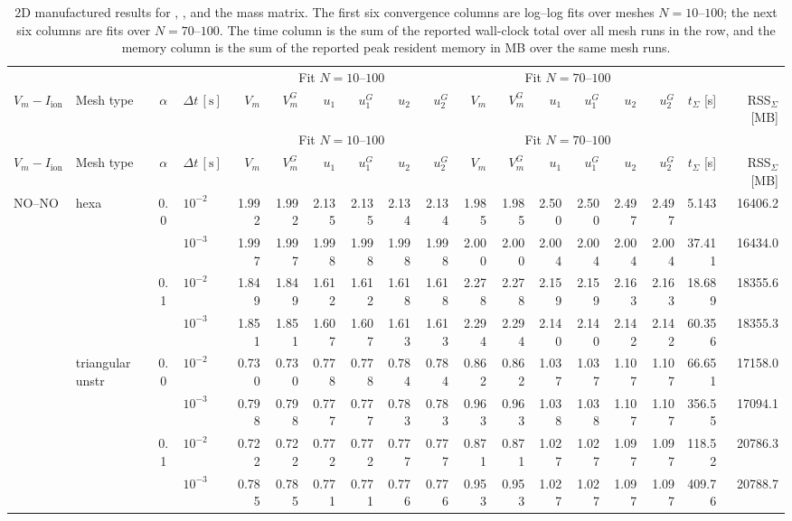 \tiny
\setlength{\tabcolsep}{1.7pt}
\begin{longtable}{llclrrrrrrrrrrrrrr}
\caption{2D manufactured results for , , and the  mass matrix. The first six convergence columns are log--log fits over meshes $N=10$--$100$; the next six columns are fits over $N=70$--$100$. The time column is the sum of the reported wall-clock total over all mesh runs in the row, and the memory column is the sum of the reported peak resident memory in MB over the same mesh runs.}\label{tab:results-2d-picard-cn-cons}\\
\toprule
& & & & \multicolumn{6}{c}{Fit $N=10$--$100$} & \multicolumn{6}{c}{Fit $N=70$--$100$} & & \\
\cmidrule(lr){5-10}\cmidrule(lr){11-16}
$V_m-I_{\mathrm{ion}}$ & Mesh type & $\alpha$ & $\Delta t\,[\text{s}]$ & $V_m$ & $V_m^G$ & $u_1$ & $u_1^G$ & $u_2$ & $u_2^G$ & $V_m$ & $V_m^G$ & $u_1$ & $u_1^G$ & $u_2$ & $u_2^G$ & $t_{\Sigma}$ [s] & RSS$_{\Sigma}$ [MB] \\
\midrule
\endfirsthead
\toprule
& & & & \multicolumn{6}{c}{Fit $N=10$--$100$} & \multicolumn{6}{c}{Fit $N=70$--$100$} & & \\
\cmidrule(lr){5-10}\cmidrule(lr){11-16}
$V_m-I_{\mathrm{ion}}$ & Mesh type & $\alpha$ & $\Delta t\,[\text{s}]$ & $V_m$ & $V_m^G$ & $u_1$ & $u_1^G$ & $u_2$ & $u_2^G$ & $V_m$ & $V_m^G$ & $u_1$ & $u_1^G$ & $u_2$ & $u_2^G$ & $t_{\Sigma}$ [s] & RSS$_{\Sigma}$ [MB] \\
\midrule
\endhead
\multirow{8}{*}{NO--NO} & \multirow{4}{*}{hexa} & \multirow{2}{*}{0.0} & $10^{-2}$ & 1.992 & 1.992 & 2.135 & 2.135 & 2.134 & 2.134 & 1.985 & 1.985 & 2.500 & 2.500 & 2.497 & 2.497 & 5.143 & 16406.2 \\
& & & $10^{-3}$ & 1.997 & 1.997 & 1.998 & 1.998 & 1.998 & 1.998 & 2.000 & 2.000 & 2.004 & 2.004 & 2.004 & 2.004 & 37.411 & 16434.0 \\\cline{3-18}
& & \multirow{2}{*}{0.1} & $10^{-2}$ & 1.849 & 1.849 & 1.612 & 1.612 & 1.618 & 1.618 & 2.278 & 2.278 & 2.159 & 2.159 & 2.163 & 2.163 & 18.689 & 18355.6 \\
& & & $10^{-3}$ & 1.851 & 1.851 & 1.607 & 1.607 & 1.613 & 1.613 & 2.294 & 2.294 & 2.140 & 2.140 & 2.142 & 2.142 & 60.356 & 18355.3 \\\cline{2-18}
& \multirow{4}{*}{triangular unstr} & \multirow{2}{*}{0.0} & $10^{-2}$ & 0.730 & 0.730 & 0.778 & 0.778 & 0.784 & 0.784 & 0.862 & 0.862 & 1.037 & 1.037 & 1.107 & 1.107 & 66.651 & 17158.0 \\
& & & $10^{-3}$ & 0.798 & 0.798 & 0.777 & 0.777 & 0.783 & 0.783 & 0.963 & 0.963 & 1.038 & 1.038 & 1.107 & 1.107 & 356.55 & 17094.1 \\\cline{3-18}
& & \multirow{2}{*}{0.1} & $10^{-2}$ & 0.722 & 0.722 & 0.772 & 0.772 & 0.777 & 0.777 & 0.871 & 0.871 & 1.027 & 1.027 & 1.097 & 1.097 & 118.52 & 20786.3 \\
& & & $10^{-3}$ & 0.785 & 0.785 & 0.771 & 0.771 & 0.776 & 0.776 & 0.953 & 0.953 & 1.027 & 1.027 & 1.097 & 1.097 & 409.76 & 20788.7 \\\hline


\end{longtable}
